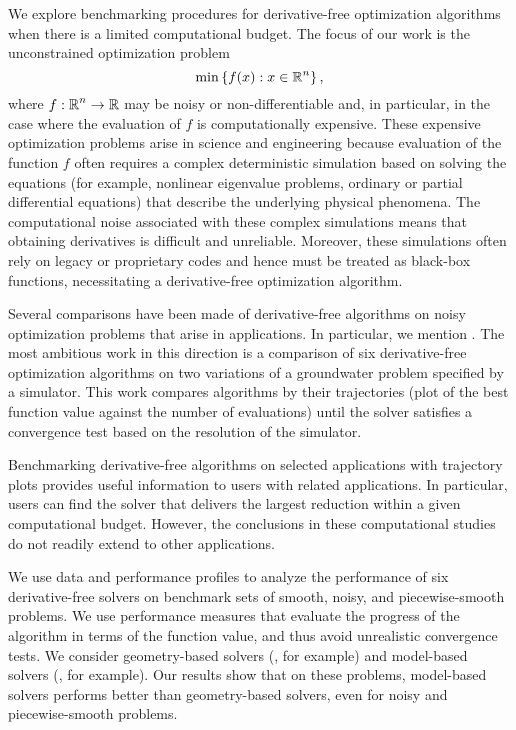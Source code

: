 \documentclass{report}
\begin{document}
We explore benchmarking procedures for derivative-free optimization
algorithms when there is a limited computational budget. The focus of our
work is the unconstrained optimization problem
\[
\min \left \{ f(x) : x \in \mbox{${\mathbb R}$}^n \right \} ,
\]
where $ f : \mbox{${\mathbb R}$}^n \to \mbox{${\mathbb R}$} $ may be noisy or non-differentiable and, in
particular, in the case where the evaluation
of $f$ is computationally expensive. These expensive optimization
problems arise in science and engineering because evaluation of the
function $ f$ often requires a complex deterministic simulation based on
solving the equations (for example, nonlinear eigenvalue problems,
ordinary or partial differential equations) that describe the underlying
physical phenomena. The
computational noise associated with these complex simulations means that
obtaining derivatives is difficult and unreliable. Moreover, these
simulations often rely on legacy or proprietary codes and hence must be
treated as black-box functions, necessitating a derivative-free
optimization algorithm.


Several comparisons have been made of derivative-free algorithms on noisy
optimization problems that arise in applications. In particular, we
mention
\cite{Shootout07,Gray2004,Torczon2003b,Oeuvray2007,RGRCAS2007}. The most
ambitious work in this direction \cite{Shootout07} is a
comparison of six derivative-free optimization algorithms on two
variations of a groundwater problem specified by a simulator. This work
compares algorithms by their trajectories (plot of the best function
value against the number of evaluations) until the solver satisfies a
convergence test based on the resolution of the simulator.

Benchmarking derivative-free algorithms on selected applications with
trajectory plots provides useful information to users with related
applications. In particular, users can find the solver that delivers the
largest reduction within a given computational budget. However, the
conclusions in these computational studies do not readily extend to other
applications.

We use data \cite{JJMSW07} and performance profiles \cite{EDD01} to
analyze the performance of six derivative-free solvers on benchmark sets
of smooth, noisy, and piecewise-smooth problems. We use performance
measures that evaluate the progress of the algorithm in terms of the
function value, and thus avoid unrealistic convergence tests. We consider
geometry-based solvers (\Apps, for example) and model-based solvers (\NA,
for example). Our results show that on these problems, model-based
solvers performs better than geometry-based solvers, even for noisy and
piecewise-smooth problems.
\end{document}
